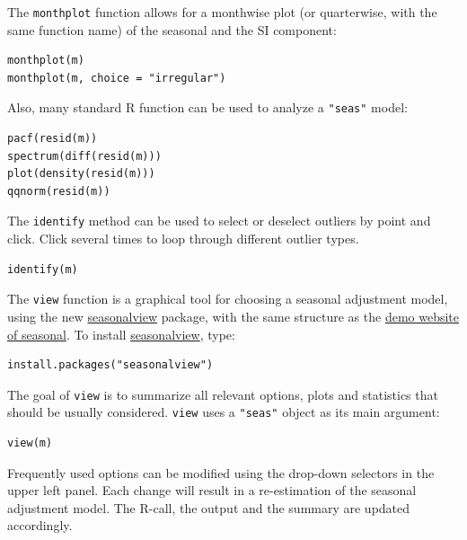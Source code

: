 The \texttt{monthplot} function allows for a monthwise plot (or
quarterwise, with the same function name) of the seasonal and the SI
component:

\begin{verbatim}
monthplot(m)
monthplot(m, choice = "irregular")
\end{verbatim}

Also, many standard R function can be used to analyze a \texttt{"seas"}
model:

\begin{verbatim}
pacf(resid(m))
spectrum(diff(resid(m)))
plot(density(resid(m)))
qqnorm(resid(m))
\end{verbatim}

The \texttt{identify} method can be used to select or deselect outliers
by point and click. Click several times to loop through different
outlier types.

\begin{verbatim}
identify(m)
\end{verbatim}


The \texttt{view} function is a graphical tool for choosing a seasonal
adjustment model, using the new
\href{https://cran.r-project.org/package=seasonalview}{seasonalview}
package, with the same structure as the
\href{http://www.seasonal.website}{demo website of seasonal}. To install
\href{https://cran.r-project.org/package=seasonalview}{seasonalview},
type:

\begin{verbatim}
install.packages("seasonalview")
\end{verbatim}

The goal of \texttt{view} is to summarize all relevant options, plots
and statistics that should be usually considered. \texttt{view} uses a
\texttt{"seas"} object as its main argument:

\begin{verbatim}
view(m)
\end{verbatim}

Frequently used options can be modified using the drop-down selectors in
the upper left panel. Each change will result in a re-estimation of the
seasonal adjustment model. The R-call, the output and the summary are
updated accordingly.

